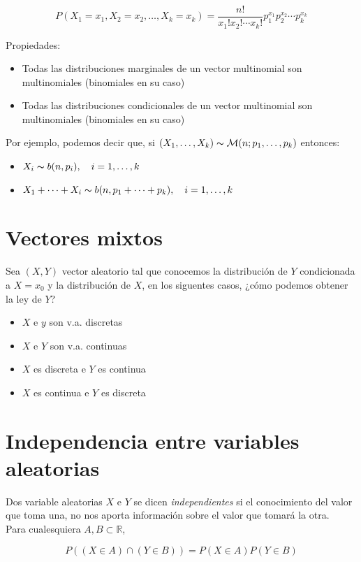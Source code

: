 \documentclass{article}
\begin{document}
\[ P(X_1 = x_1, X_2 = x_2,\dots,X_k = x_k) = \frac{n!}{x_{1}!x_{2}!\cdots x_{k}!}p_{1}^{x_1}p_{2}^{x_2}\cdots p_{k}^{x_k}\]

Propiedades:
\begin{itemize}
    \item Todas las distribuciones marginales de un vector multinomial son multinomiales (binomiales en su caso)
    \item Todas las distribuciones condicionales de un vector multinomial son multinomiales (binomiales en su caso)
\end{itemize}
Por ejemplo, podemos decir que, si $(X_1,\dots,X_k)\thicksim\mathcal{M}(n;p_1,\dots,p_k)$ entonces:
\begin{itemize}
    \item $X_i\thicksim b(n, p_i),\quad i = 1,\dots,k$
    \item $X_1 + \cdots + X_i\thicksim b(n, p_1 + \cdots + p_k), \quad i = 1, \dots, k$
\end{itemize}


\section{Vectores mixtos}


Sea $(X, Y)$ vector aleatorio tal que conocemos la distribución  de $Y$ condicionada a $X = x_0$ y la distribución de $X$, en los siguentes casos,
¿cómo podemos obtener la ley de $Y$?
\begin{itemize}
    \item $X$ e $y$ son v.a. discretas
    \item $X$ e $Y$ son v.a. continuas
    \item $X$ es discreta e $Y$ es continua
    \item $X$ es continua e $Y$ es discreta
\end{itemize}


\section{Independencia entre variables aleatorias}


Dos variable aleatorias $X$ e $Y$ se dicen \textit{independientes} si el conocimiento del valor que toma una, no nos aporta información sobre el valor 
que tomará la otra. \\
Para cualesquiera $A, B \subset \mathbb{R}$,

\[ P((X \in A) \cap (Y \in B)) = P(X \in A)P(Y \in B) \]
\end{document}
